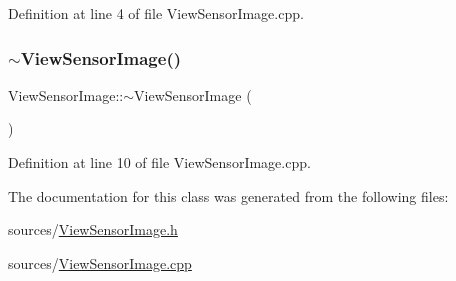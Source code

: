 Definition at line 4 of file View\+Sensor\+Image.\+cpp.

\mbox{\label{class_view_sensor_image_a38a6cf9420306239e6d91e3a960bc131}} 
\subsubsection{\texorpdfstring{$\sim$\+View\+Sensor\+Image()}{~ViewSensorImage()}}
{\footnotesize\ttfamily View\+Sensor\+Image\+::$\sim$\+View\+Sensor\+Image (\begin{DoxyParamCaption}{ }\end{DoxyParamCaption})}



Definition at line 10 of file View\+Sensor\+Image.\+cpp.



The documentation for this class was generated from the following files\+:\begin{DoxyCompactItemize}
\item 
sources/\mbox{\hyperlink{_view_sensor_image_8h}{View\+Sensor\+Image.\+h}}\item 
sources/\mbox{\hyperlink{_view_sensor_image_8cpp}{View\+Sensor\+Image.\+cpp}}\end{DoxyCompactItemize}

